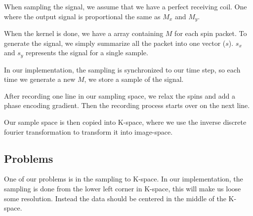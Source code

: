 When sampling the signal, we assume that we have a perfect receiving
coil. One where the output signal is proportional the same as $M_x$
and $M_y$.

When the kernel is done, we have a array containing $M$ for each spin
packet. To generate the signal, we simply summarize all the packet
into one vector ($s$). $s_x$ and $s_y$ represents the signal for a
single sample.

In our implementation, the sampling is synchronized to our time step,
so each time we generate a new $M$, we store a sample of the signal.

After recording one line in our sampling space, we relax the spins and
add a phase encoding gradient. Then the recording process starts over
on the next line.

Our sample space is then copied into K-space, where we use the
inverse discrete fourier transformation to transform it into image-space.

\subsection{Problems}

One of our problems is in the sampling to K-space. In our
implementation, the sampling is done from the lower left corner in
K-space, this will make us loose some resolution. Instead the data
should be centered in the middle of the K-space.




